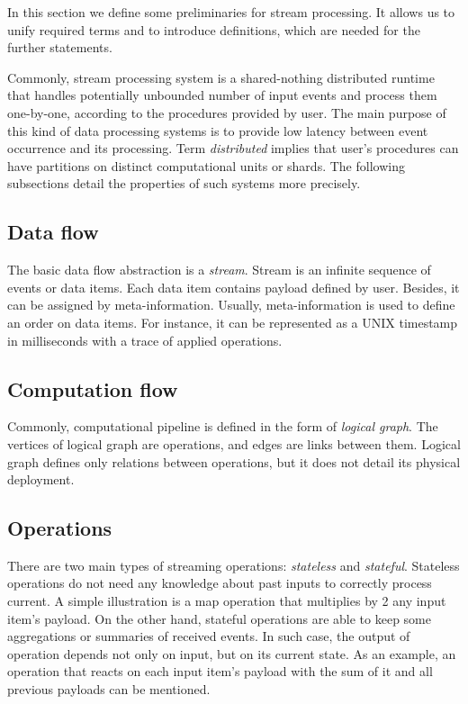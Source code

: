 
\label {fs-stream}

In this section we define some preliminaries for stream processing. It allows us to unify required terms and to introduce definitions, which are needed for the further statements.

Commonly, stream processing system is a shared-nothing distributed runtime that handles potentially unbounded number of input events and process them one-by-one, according to the procedures provided by user. The main purpose of this kind of data processing systems is to provide low latency between event occurrence and its processing. Term {\it distributed} implies that user's procedures can have partitions on distinct computational units or shards. The following subsections detail the properties of such systems more precisely.  

\subsection{Data flow}
The basic data flow abstraction is a {\it stream}. Stream is an infinite sequence of events or data items. Each data item contains payload defined by user. Besides, it can be assigned by meta-information. Usually, meta-information is used to define an order on data items. For instance, it can be represented as a UNIX timestamp in milliseconds with a trace of applied operations.

\subsection{Computation flow}
Commonly, computational pipeline is defined in the form of {\it logical graph}. The vertices of logical graph are operations, and edges are links between them. Logical graph defines only relations between operations, but it does not detail its physical deployment.    

\subsection{Operations}
There are two main types of streaming operations: {\it stateless} and {\it stateful}. Stateless operations do not need any knowledge about past inputs to correctly process current. A simple illustration is a map operation that multiplies by 2 any input item's payload. On the other hand, stateful operations are able to keep some aggregations or summaries of received events. In such case, the output of operation depends not only on input, but on its current state. As an example, an operation that reacts on each input item's payload with the sum of it and all previous payloads can be mentioned. 

